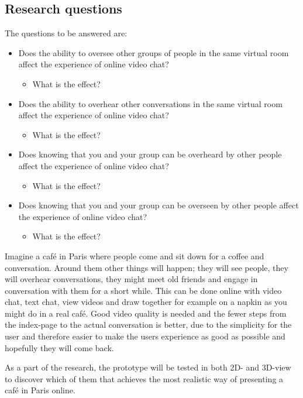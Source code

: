 \documentclass[12pt, titlepage]{article}
\begin{document}
\subsection{Research questions}
The questions to be answered are:
\begin{itemize}
	\item Does the ability to oversee other groups of people in the same virtual room affect the experience of online video chat?
		\begin{itemize}
			\item What is the effect?
		\end{itemize}
	\item Does the ability to overhear other conversations in the same virtual room affect the experience of online video chat?
		\begin{itemize}
			\item What is the effect?
		\end{itemize}
	\item Does knowing that you and your group can be overheard by other people affect the experience of online video chat?
		\begin{itemize}
			\item What is the effect?
		\end{itemize}
	\item Does knowing that you and your group can be overseen by other people affect the experience of online video chat?
		\begin{itemize}
			\item What is the effect?
		\end{itemize}
\end{itemize}

Imagine a café in Paris where people come and sit down for a coffee and conversation. Around them other things will happen; they will see people, they will overhear conversations, they might meet old friends and engage in conversation with them for a short while. This can be done online with video chat, text chat, view videos and draw together for example on a napkin as you might do in a real café. Good video quality is needed and the fewer steps from the index-page to the actual conversation is better, due to the simplicity for the user and therefore easier to make the users experience as good as possible and hopefully they will come back.

As a part of the research, the prototype will be tested in both 2D- and 3D-view to discover which of them that achieves the most realistic way of presenting a café in Paris online.
\end{document}
